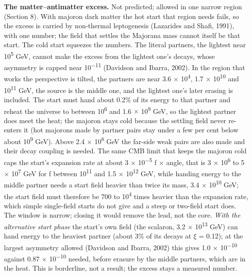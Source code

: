 \documentclass[
  11pt,
]{article}
\begin{document}
\textbf{The matter--antimatter excess.} Not predicted; allowed in one narrow region (Section 8). With majoron dark matter the hot start that region needs fails, so the excess is carried by non-thermal leptogenesis (Lazarides and Shafi, 1991), with one number; the field that settles the Majorana mass cannot itself be that start. The cold start squeezes the numbers. The literal partners, the lightest near 10\textsuperscript{5} GeV, cannot make the excess from the lightest one's decays, whose asymmetry is capped near 10\textsuperscript{\ensuremath{-}11} (Davidson and Ibarra, 2002). In the region that works the perspective is tilted, the partners are near 3.6 \ensuremath{\times} 10\textsuperscript{4}, 1.7 \ensuremath{\times} 10\textsuperscript{10} and 10\textsuperscript{11} GeV, the source is the middle one, and the lightest one's later erasing is included. The start must hand about 0.2\% of its energy to that partner and reheat the universe to between 10\textsuperscript{6} and 1.6 \ensuremath{\times} 10\textsuperscript{9} GeV, so the lightest partner does meet the heat; the majoron stays cold because the settling field never re-enters it (hot majorons made by partner pairs stay under a few per cent below about 10\textsuperscript{9} GeV). Above 2.4 \ensuremath{\times} 10\textsuperscript{8} GeV the far-side weak pairs are also made and their decay coupling is needed. The same CMB limit that keeps the majoron cold caps the start's expansion rate at about 3 \ensuremath{\times} 10\textsuperscript{\ensuremath{-}5} f \ensuremath{\times} angle, that is 3 \ensuremath{\times} 10\textsuperscript{6} to 5 \ensuremath{\times} 10\textsuperscript{7} GeV for f between 10\textsuperscript{11} and 1.5 \ensuremath{\times} 10\textsuperscript{12} GeV, while handing energy to the middle partner needs a start field heavier than twice its mass, 3.4 \ensuremath{\times} 10\textsuperscript{10} GeV; the start field must therefore be 700 to 10\textsuperscript{4} times heavier than the expansion rate, which simple single-field starts do not give and a steep or two-field start does. The window is narrow; closing it would remove the lead, not the core. \emph{With the alternative start phase} the start's own field (the scalaron, 3.2 \ensuremath{\times} 10\textsuperscript{13} GeV) can hand energy to the heaviest partner (about 3\% of its decays at \ensuremath{\xi} = 0.12); at the largest asymmetry allowed (Davidson and Ibarra, 2002) this gives 1.0 \ensuremath{\times} 10\textsuperscript{\ensuremath{-}10} against 0.87 \ensuremath{\times} 10\textsuperscript{\ensuremath{-}10} needed, before erasure by the middle partners, which are in the heat. This is borderline, not a result; the excess stays a measured number.
\end{document}
